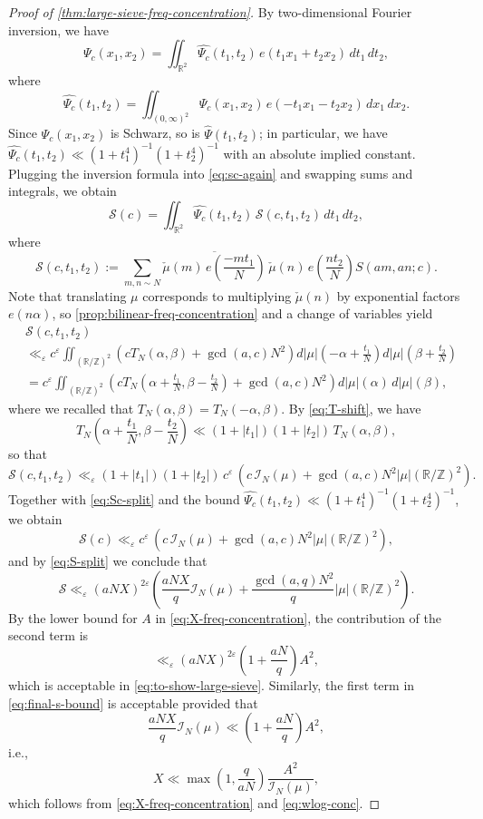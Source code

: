 \documentclass[reqno,11pt]{amsart}
\theoremstyle{remark}
\numberwithin{equation}{section}
\newcommand{\Z}{\mathbb{Z}}
\newcommand{\R}{\mathbb{R}}
\newcommand{\mI}{\mathcal{I}}
\newcommand{\mS}{\mathcal{S}}
\newcommand{\eps}{\varepsilon}
\renewcommand{\bar}{\overline}
\renewcommand{\hat}{\widehat}
\begin{document}
\begin{proof}[Proof of \cref{thm:large-sieve-freq-concentration}]
By two-dimensional Fourier inversion, we have
\[
    \Psi_c(x_1, x_2) = \iint_{\R^2} \hat{\Psi_c}(t_1, t_2)\, e(t_1 x_1 + t_2 x_2)\, dt_1\, dt_2,
\]
where
\[
    \hat{\Psi_c}(t_1, t_2) = \iint_{(0, \infty)^2} \Psi_c(x_1, x_2)\, e(- t_1 x_1 - t_2 x_2)\, dx_1\, dx_2.
\]
Since $\Psi_c(x_1, x_2)$ is Schwarz, so is $\hat{\Psi}(t_1, t_2)$; in particular, we have $\hat{\Psi_c}(t_1, t_2) \ll (1+t_1^4)^{-1}(1+t_2^4)^{-1}$ with an absolute implied constant. Plugging the inversion formula into \cref{eq:sc-again} and swapping sums and integrals, we obtain
\begin{equation} \label{eq:Sc-split}
    \mS(c) = \iint_{\R^2} \hat{\Psi_c}(t_1, t_2)\, \mS(c, t_1, t_2)\, dt_1\, dt_2,
\end{equation}
where
\[
    \mS(c, t_1, t_2) := \sum_{m,n \sim N} \bar{\check{\mu}(m)\, e\left(\frac{-mt_1}{N}\right)} \, \check{\mu}(n)\, e\left(\frac{nt_2}{N}\right) S(am, an; c).
\]
Note that translating $\mu$ corresponds to multiplying $\check{\mu}(n)$ by exponential factors $e(n\alpha)$, so \cref{prop:bilinear-freq-concentration} and a change of variables yield
\[
\begin{aligned}
    &\mS(c, t_1, t_2) 
    \\
    &\ll_\eps 
    c^\eps \iint_{(\R/\Z)^2} \left(c T_N(\alpha, \beta) + \gcd(a, c) N^2 \right) d|\mu|\left(-\alpha+\frac{t_1}{N}\right) d|\mu|\left(\beta+\frac{t_2}{N}\right)
    \\
    &=
    c^\eps \iint_{(\R/\Z)^2} \left(c T_N\left(\alpha + \frac{t_1}{N}, \beta - \frac{t_2}{N}\right) + \gcd(a, c) N^2 \right) d|\mu|(\alpha)\, d|\mu|(\beta),
\end{aligned}
\]
where we recalled that $T_N(\alpha, \beta) = T_N(-\alpha, \beta)$. By \cref{eq:T-shift}, we have
\[
    T_N\left(\alpha + \frac{t_1}{N}, \beta - \frac{t_2}{N}\right)
    \ll 
    (1 + |t_1|)(1 + |t_2|)\, T_{N}(\alpha, \beta),
\]
so that
\[
    \mS(c, t_1, t_2) \ll_\eps (1 + |t_1|)(1 + |t_2|)\,c^\eps\, \left(c\, \mI_{N} (\mu) + \gcd(a, c) N^2 |\mu|(\R/\Z)^2 \right).
\]
Together with \cref{eq:Sc-split} and the bound $\hat{\Psi_c}(t_1, t_2) \ll (1+t_1^4)^{-1}(1+t_2^4)^{-1}$, we obtain
\[
    \mS(c) \ll_\eps c^\eps\, \left(c\, \mI_N \left(\mu\right) + \gcd(a, c) N^2 |\mu|(\R/\Z)^2 \right),
\]
and by \cref{eq:S-split} we conclude that
\begin{equation} \label{eq:final-s-bound}
    \mS \ll_\eps (aNX)^{2\eps} \left(\frac{aNX}{q} \mI_{N} (\mu) + \frac{\gcd(a, q) N^2}{q} |\mu|(\R/\Z)^2 \right).
\end{equation}
By the lower bound for $A$ in \cref{eq:X-freq-concentration}, the contribution of the second term is 
\[
    \ll_\eps (aNX)^{2\eps} \left(1 + \frac{aN}{q}\right) A^2,
\]
which is acceptable in \cref{eq:to-show-large-sieve}. Similarly, the first term in \cref{eq:final-s-bound} is acceptable provided that
\[
    \frac{aNX}{q} \mI_N(\mu) \ll \left(1 + \frac{aN}{q}\right) A^2,
\]
i.e.,
\[
    X \ll \max\left(1, \frac{q}{aN}\right) \frac{A^2}{\mI_N(\mu)},
\]
which follows from \cref{eq:X-freq-concentration} and \cref{eq:wlog-conc}.
\end{proof}
\end{document}
